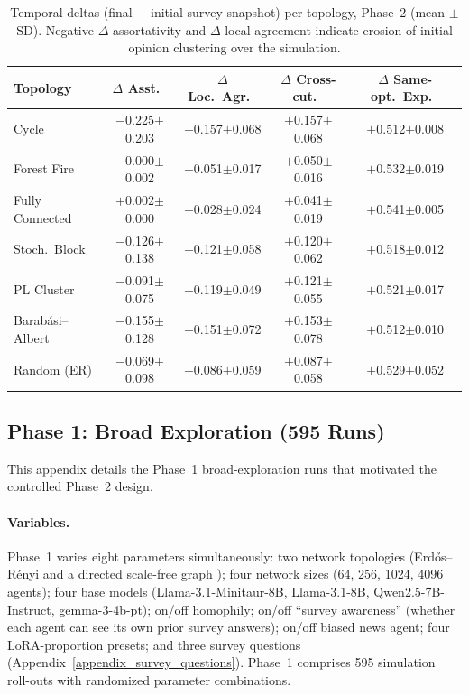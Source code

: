 \documentclass[11pt]{article}
\begin{document}
\begin{table}[h]
\centering
\small
\begin{tabular}{lcccc}
\toprule
Topology & $\Delta$ Asst.\ & $\Delta$ Loc.\ Agr.\ & $\Delta$ Cross-cut.\ & $\Delta$ Same-opt.\ Exp.\ \\
\midrule
Cycle               & $-$0.225$\pm$0.203 & $-$0.157$\pm$0.068 & $+$0.157$\pm$0.068 & $+$0.512$\pm$0.008 \\
Forest Fire         & $-$0.000$\pm$0.002 & $-$0.051$\pm$0.017 & $+$0.050$\pm$0.016 & $+$0.532$\pm$0.019 \\
Fully Connected     & $+$0.002$\pm$0.000 & $-$0.028$\pm$0.024 & $+$0.041$\pm$0.019 & $+$0.541$\pm$0.005 \\
Stoch.\ Block       & $-$0.126$\pm$0.138 & $-$0.121$\pm$0.058 & $+$0.120$\pm$0.062 & $+$0.518$\pm$0.012 \\
PL Cluster          & $-$0.091$\pm$0.075 & $-$0.119$\pm$0.049 & $+$0.121$\pm$0.055 & $+$0.521$\pm$0.017 \\
Barab\'{a}si--Albert & $-$0.155$\pm$0.128 & $-$0.151$\pm$0.072 & $+$0.153$\pm$0.078 & $+$0.512$\pm$0.010 \\
\midrule
Random (ER)         & $-$0.069$\pm$0.098 & $-$0.086$\pm$0.059 & $+$0.087$\pm$0.058 & $+$0.529$\pm$0.052 \\
\bottomrule
\end{tabular}
\caption{Temporal deltas (final $-$ initial survey snapshot) per topology, Phase~2 (mean $\pm$ SD). Negative $\Delta$ assortativity and $\Delta$ local agreement indicate erosion of initial opinion clustering over the simulation.}
\label{tab:appendix_delta_per_topo}
\end{table}

\subsection{Phase 1: Broad Exploration (595 Runs)}
\label{appendix:phase1}

This appendix details the Phase~1 broad-exploration runs that motivated the controlled Phase~2 design.

\paragraph{Variables.} Phase~1 varies eight parameters simultaneously: two network topologies (Erd\H{o}s--R\'enyi and a directed scale-free graph \cite{10.5555/644108.644133}); four network sizes (64, 256, 1024, 4096 agents); four base models (Llama-3.1-Minitaur-8B, Llama-3.1-8B, Qwen2.5-7B-Instruct, gemma-3-4b-pt); on/off homophily; on/off ``survey awareness'' (whether each agent can see its own prior survey answers); on/off biased news agent; four LoRA-proportion presets; and three survey questions (Appendix~\ref{appendix_survey_questions}). Phase~1 comprises 595 simulation roll-outs with randomized parameter combinations.
\end{document}
